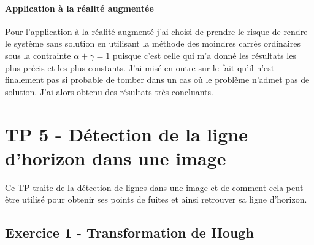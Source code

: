 \documentclass{article}
\begin{document}
\paragraph{Application à la réalité augmentée}
Pour l'application à la réalité augmenté j'ai choisi de prendre le risque de rendre le système sans solution en utilisant la méthode des moindres carrés ordinaires sous la contrainte $\alpha + \gamma = 1$ puisque c'est celle qui m'a donné les résultats les plus précis et les plus constants. J'ai misé en outre sur le fait qu'il n'est finalement pas si probable de tomber dans un cas où le problème n'admet pas de solution. J'ai alors obtenu des résultats très concluants.

\section{TP 5 - Détection de la ligne d'horizon dans une image}
Ce TP traite de la détection de lignes dans une image et de comment cela peut être utilisé pour obtenir ses points de fuites et ainsi retrouver sa ligne d'horizon.

\subsection{Exercice 1 - Transformation de Hough}
\end{document}
